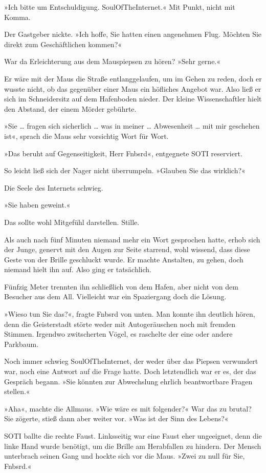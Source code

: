 »Ich bitte um Entschuldigung. SoulOfTheInternet.« Mit Punkt, nicht mit Komma.

Der Gastgeber nickte. »Ich hoffe, Sie hatten einen angenehmen Flug. Möchten Sie direkt zum Geschäftlichen kommen?«

War da Erleichterung aus dem Mauspiepsen zu hören? »Sehr gerne.«

Er wäre mit der Maus die Straße entlanggelaufen, um im Gehen zu reden, doch er wusste nicht, ob das gegenüber einer Maus ein höfliches Angebot war. Also ließ er sich im Schneidersitz auf dem Hafenboden nieder. Der kleine Wissenschaftler hielt den Abstand, der einem Mörder gebührte.

»Sie … fragen sich sicherlich … was in meiner … Abwesenheit … mit mir geschehen ist«, sprach die Maus sehr vorsichtig Wort für Wort.

»Das beruht auf Gegenseitigkeit, Herr Fnbsrd«, entgegnete SOTI reserviert.

So leicht ließ sich der Nager nicht überrumpeln. »Glauben Sie das wirklich?«

Die Seele des Internets schwieg.

»Sie haben geweint.«

Das sollte wohl Mitgefühl darstellen. Stille.

Als auch nach fünf Minuten niemand mehr ein Wort gesprochen hatte, erhob sich der Junge, genervt mit den Augen zur Seite starrend, wohl wissend, dass diese Geste von der Brille geschluckt wurde. Er machte Anstalten, zu gehen, doch niemand hielt ihn auf. Also ging er tatsächlich.

Fünfzig Meter trennten ihn schließlich von dem Hafen, aber nicht von dem Besucher aus dem All. Vielleicht war ein Spaziergang doch die Lösung.

»Wieso tun Sie das?«, fragte Fnbsrd von unten. Man konnte ihn deutlich hören, denn die Geisterstadt störte weder mit Autogeräuschen noch mit fremden Stimmen. Irgendwo zwitscherten Vögel, es raschelte der eine oder andere Parkbaum.

Noch immer schwieg SoulOfTheInternet, der weder über das Piepsen verwundert war, noch eine Antwort auf die Frage hatte. Doch letztendlich war er es, der das Gespräch begann. »Sie könnten zur Abwechslung ehrlich beantwortbare Fragen stellen.«

»Aha«, machte die Allmaus. »Wie wäre es mit folgender?« War das zu brutal? Sie zögerte, stieß dann aber weiter vor. »Was ist der Sinn des Lebens?«

SOTI ballte die rechte Faust. Linksseitig war eine Faust eher ungeeignet, denn die linke Hand wurde benötigt, um die Brille am Herabfallen zu hindern. Der Mensch unterbrach seinen Gang und hockte sich vor die Maus. »Zwei zu null für Sie, Fnbsrd.«

